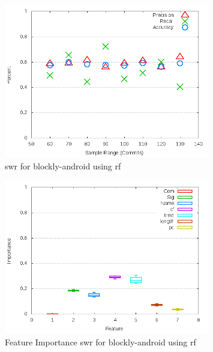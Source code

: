 \begin{figure}[!t]
\centering
\includegraphics[width=0.8\textwidth]{images/rf/test_1/blockly-android_sample_range.png}
\caption{\gls{swr} for blockly-android using \gls{rf}}
\label{fig:test_1_blockly-android_rf}
\end{figure}

\begin{figure}[!t]
\centering
\includegraphics[width=0.8\textwidth]{images/rf/test_1/blockly-android_importance.png}
\caption{Feature Importance \gls{swr} for blockly-android using \gls{rf}}
\label{fig:test_1_blockly-android_rf_importance}
\end{figure}

